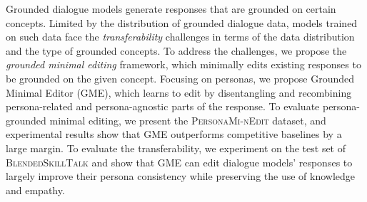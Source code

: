 Grounded dialogue models generate responses that are grounded on certain concepts. Limited by the distribution of grounded dialogue data, models trained on such data face the \textit{transferability} challenges in terms of the data distribution and the type of grounded concepts. To address the challenges, we propose the \textit{grounded minimal editing} framework, which minimally edits existing responses to be grounded on the given concept. Focusing on personas, we propose Grounded Minimal Editor (GME), which learns to edit by disentangling and recombining persona-related and persona-agnostic parts of the response. To evaluate persona-grounded minimal editing, we present the \textsc{PersonaMi-nEdit} dataset, and experimental results show that GME outperforms competitive baselines by a large margin. To evaluate the transferability, we experiment on the test set of \textsc{BlendedSkillTalk} and show that GME can edit dialogue models' responses to largely improve their persona consistency while preserving the use of knowledge and empathy.
